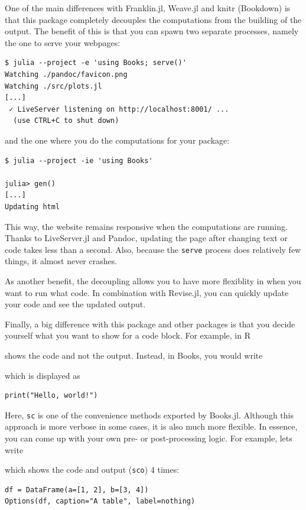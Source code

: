 \documentclass[
  14pt
  american,
  paper=a4,
  ,captions=tableheading
]{scrreprt}
\newcommand{\passthrough}[1]{#1}
\begin{document}
One of the main differences with Franklin.jl, Weave.jl and knitr
(Bookdown) is that this package completely decouples the computations
from the building of the output. The benefit of this is that you can
spawn two separate processes, namely the one to serve your webpages:

\begin{lstlisting}
$ julia --project -e 'using Books; serve()'
Watching ./pandoc/favicon.png
Watching ./src/plots.jl
[...]
 ✓ LiveServer listening on http://localhost:8001/ ...
  (use CTRL+C to shut down)
\end{lstlisting}

and the one where you do the computations for your package:

\begin{lstlisting}
$ julia --project -ie 'using Books'

julia> gen()
[...]
Updating html
\end{lstlisting}

This way, the website remains responsive when the computations are
running. Thanks to LiveServer.jl and Pandoc, updating the page after
changing text or code takes less than a second. Also, because the
\passthrough{\lstinline!serve!} process does relatively few things, it
almost never crashes.

As another benefit, the decoupling allows you to have more flexiblity in
when you want to run what code. In combination with Revise.jl, you can
quickly update your code and see the updated output.

Finally, a big difference with this package and other packages is that
you decide yourself what you want to show for a code block. For example,
in R

shows the code and not the output. Instead, in Books, you would write

which is displayed as

\begin{lstlisting}
print("Hello, world!")
\end{lstlisting}

Here, \passthrough{\lstinline!sc!} is one of the convenience methods
exported by Books.jl. Although this approach is more verbose in some
cases, it is also much more flexible. In essence, you can come up with
your own pre- or post-processing logic. For example, lets write

which shows the code and output (\passthrough{\lstinline!sco!}) 4 times:

\begin{lstlisting}
df = DataFrame(a=[1, 2], b=[3, 4])
Options(df, caption="A table", label=nothing)
\end{lstlisting}
\end{document}
